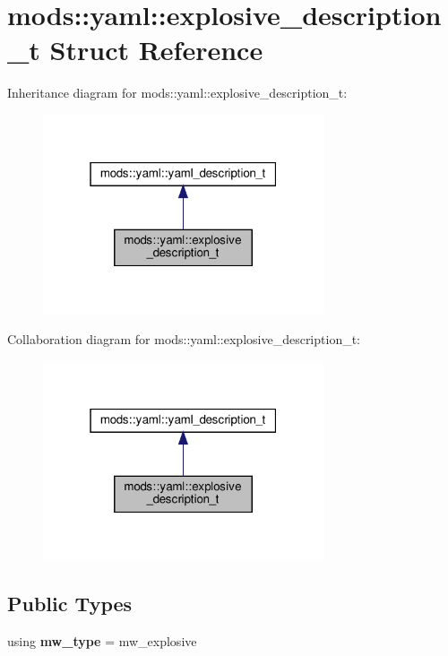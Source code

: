 \hypertarget{structmods_1_1yaml_1_1explosive__description__t}{}\section{mods\+:\+:yaml\+:\+:explosive\+\_\+description\+\_\+t Struct Reference}
\label{structmods_1_1yaml_1_1explosive__description__t}


Inheritance diagram for mods\+:\+:yaml\+:\+:explosive\+\_\+description\+\_\+t\+:\nopagebreak
\begin{figure}[H]
\begin{center}
\leavevmode
\includegraphics[width=235pt]{structmods_1_1yaml_1_1explosive__description__t__inherit__graph}
\end{center}
\end{figure}


Collaboration diagram for mods\+:\+:yaml\+:\+:explosive\+\_\+description\+\_\+t\+:\nopagebreak
\begin{figure}[H]
\begin{center}
\leavevmode
\includegraphics[width=235pt]{structmods_1_1yaml_1_1explosive__description__t__coll__graph}
\end{center}
\end{figure}
\subsection*{Public Types}
\begin{DoxyCompactItemize}
\item 
\mbox{\label{structmods_1_1yaml_1_1explosive__description__t_a7d2975489831cb4acfb51f948ccd8c0a}} 
using {\bfseries mw\+\_\+type} = mw\+\_\+explosive
\end{DoxyCompactItemize}
